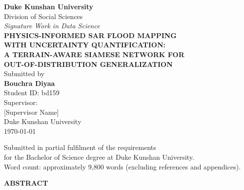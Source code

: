 \documentclass[12pt]{article}
\begin{document}
\setcounter{page}{1}

\begin{titlepage}
\centering
\vspace*{1.0cm}

{\large\bfseries Duke Kunshan University}\\[0.25cm]
{\large Division of Social Sciences}\\[0.5cm]
{\large\itshape Signature Work in Data Science}\\[2.2cm]

{\LARGE\bfseries
PHYSICS-INFORMED SAR FLOOD MAPPING\\[0.35cm]
WITH UNCERTAINTY QUANTIFICATION:\\[0.35cm]
A TERRAIN-AWARE SIAMESE NETWORK FOR\\[0.35cm]
OUT-OF-DISTRIBUTION GENERALIZATION
}\\[2.5cm]

{\large Submitted by}\\[0.4cm]
{\large\bfseries Bouchra Diyaa}\\[0.25cm]
{\normalsize Student ID: bd159}\\[1.2cm]

{\large Supervisor:}\\[0.3cm]
{\large [Supervisor Name]}\\[0.25cm]
{\normalsize Duke Kunshan University}\\[1.5cm]

{\large \today}\\[2.0cm]

\vfill
\begin{minipage}{0.75\textwidth}
\centering
\small
Submitted in partial fulfilment of the requirements\\
for the Bachelor of Science degree at Duke Kunshan University.\\[0.6em]
Word count: approximately 9{,}800 words (excluding references and appendices).
\end{minipage}

\end{titlepage}

\newpage
{}
{}
\begin{center}
  {\large\bfseries ABSTRACT}
\end{center}
\vspace{0.5em}
\end{document}
